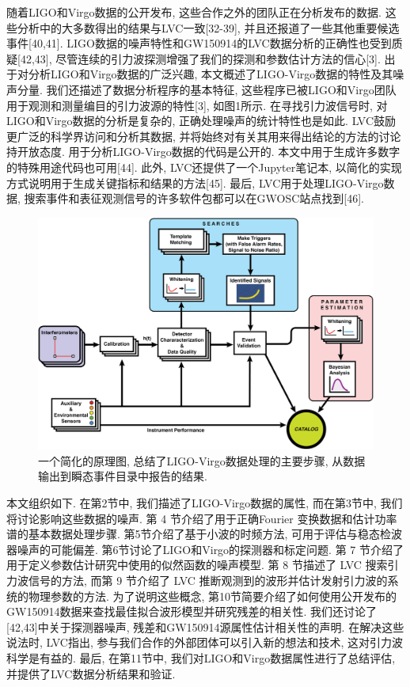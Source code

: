 \documentclass[a4paper]{\documentclassname}
\theoremstyle{definition}
\begin{document}
随着LIGO和Virgo数据的公开发布, 这些合作之外的团队正在分析发布的数据. 这些分析中的大多数得出的结果与LVC一致[32-39], 并且还报道了一些其他重要候选事件[40,41].  LIGO数据的噪声特性和GW150914的LVC数据分析的正确性也受到质疑[42,43], 尽管连续的引力波探测增强了我们的探测和参数估计方法的信心[3]. 出于对分析LIGO和Virgo数据的广泛兴趣, 本文概述了LIGO-Virgo数据的特性及其噪声分量. 我们还描述了数据分析程序的基本特征, 这些程序已被LIGO和Virgo团队用于观测和测量编目的引力波源的特性[3], 如图1所示. 在寻找引力波信号时, 对LIGO和Virgo数据的分析是复杂的, 正确处理噪声的统计特性也是如此. LVC鼓励更广泛的科学界访问和分析其数据, 并将始终对有关其用来得出结论的方法的讨论持开放态度. 用于分析LIGO-Virgo数据的代码是公开的. 本文中用于生成许多数字的特殊用途代码也可用[44]. 此外, LVC还提供了一个Jupyter笔记本, 以简化的实现方式说明用于生成关键指标和结果的方法[45]. 最后, LVC用于处理LIGO-Virgo数据, 搜索事件和表征观测信号的许多软件包都可以在GWOSC站点找到[46]. 
\begin{figure}[htbp]
    \centering
    \includegraphics{img/1.jpg}
    \caption{
        一个简化的原理图, 总结了LIGO-Virgo数据处理的主要步骤, 从数据输出到瞬态事件目录中报告的结果. 
    }
\end{figure}

本文组织如下. 在第2节中, 我们描述了LIGO-Virgo数据的属性, 而在第3节中, 我们将讨论影响这些数据的噪声. 第 4 节介绍了用于正确Fourier 变换数据和估计功率谱的基本数据处理步骤. 第5节介绍了基于小波的时频方法, 可用于评估与稳态检波器噪声的可能偏差. 第6节讨论了LIGO和Virgo的探测器和标定问题. 第 7 节介绍了用于定义参数估计研究中使用的似然函数的噪声模型. 第 8 节描述了 LVC 搜索引力波信号的方法, 而第 9 节介绍了 LVC 推断观测到的波形并估计发射引力波的系统的物理参数的方法. 为了说明这些概念, 第10节简要介绍了如何使用公开发布的GW150914数据来查找最佳拟合波形模型并研究残差的相关性. 我们还讨论了[42,43]中关于探测器噪声, 残差和GW150914源属性估计相关性的声明. 在解决这些说法时, LVC指出, 参与我们合作的外部团体可以引入新的想法和技术, 这对引力波科学是有益的. 最后, 在第11节中, 我们对LIGO和Virgo数据属性进行了总结评估, 并提供了LVC数据分析结果和验证. 
\end{document}

